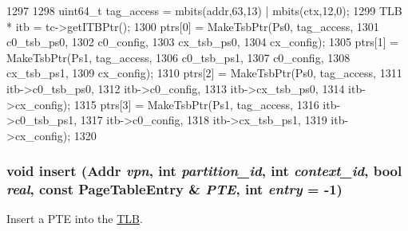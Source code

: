 \begin{DoxyCode}
1297 {
1298     uint64_t tag_access = mbits(addr,63,13) | mbits(ctx,12,0);
1299     TLB * itb = tc->getITBPtr();
1300     ptrs[0] = MakeTsbPtr(Ps0, tag_access,
1301                 c0_tsb_ps0,
1302                 c0_config,
1303                 cx_tsb_ps0,
1304                 cx_config);
1305     ptrs[1] = MakeTsbPtr(Ps1, tag_access,
1306                 c0_tsb_ps1,
1307                 c0_config,
1308                 cx_tsb_ps1,
1309                 cx_config);
1310     ptrs[2] = MakeTsbPtr(Ps0, tag_access,
1311                 itb->c0_tsb_ps0,
1312                 itb->c0_config,
1313                 itb->cx_tsb_ps0,
1314                 itb->cx_config);
1315     ptrs[3] = MakeTsbPtr(Ps1, tag_access,
1316                 itb->c0_tsb_ps1,
1317                 itb->c0_config,
1318                 itb->cx_tsb_ps1,
1319                 itb->cx_config);
1320 }
\end{DoxyCode}
\hypertarget{classSparcISA_1_1TLB_a2b2db94fc3a8f3652866d0dc2aabcf87}{
\subsubsection[{insert}]{\setlength{\rightskip}{0pt plus 5cm}void insert ({\bf Addr} {\em vpn}, \/  int {\em partition\_\-id}, \/  int {\em context\_\-id}, \/  bool {\em real}, \/  const {\bf PageTableEntry} \& {\em PTE}, \/  int {\em entry} = {\ttfamily -\/1})}}
\label{classSparcISA_1_1TLB_a2b2db94fc3a8f3652866d0dc2aabcf87}
Insert a PTE into the \hyperlink{classSparcISA_1_1TLB}{TLB}. 


